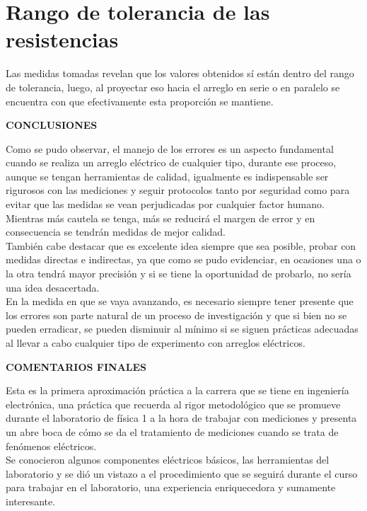 \documentclass[12pt]{article}
\begin{document}
	\section*{Rango de tolerancia de las resistencias}
	
	\noindent Las medidas tomadas revelan que los valores obtenidos sí están dentro del rango de tolerancia, luego, al proyectar eso hacia el arreglo en serie o en paralelo se encuentra con que efectivamente esta proporción se mantiene.\\
	
	\newpage
	
	\begin{center}
		\textbf{\large CONCLUSIONES}\\
	\end{center}
	
	\noindent Como se pudo observar, el manejo de los errores es un aspecto fundamental cuando se realiza un arreglo eléctrico de cualquier tipo, durante ese proceso, aunque se tengan herramientas de calidad, igualmente es indispensable ser rigurosos con las mediciones y seguir protocolos tanto por seguridad como para evitar que las medidas se vean perjudicadas por cualquier factor humano. Mientras más cautela se tenga, más se reducirá el margen de error y en consecuencia se tendrán medidas de mejor calidad.\\
	
	\noindent También cabe destacar que es excelente idea siempre que sea posible, probar con medidas directas e indirectas, ya que como se pudo evidenciar, en ocasiones una o la otra tendrá mayor precisión y si se tiene la oportunidad de probarlo, no sería una idea desacertada.\\
	
	\noindent En la medida en que se vaya avanzando, es necesario siempre tener presente que los errores son parte natural de un proceso de investigación y que si bien no se pueden erradicar, se pueden disminuir al mínimo si se siguen prácticas adecuadas al llevar a cabo cualquier tipo de experimento con arreglos eléctricos.
	
	\newpage
	
	\begin{center}
		\textbf{\large COMENTARIOS FINALES}\\
	\end{center}
	
	\noindent Esta es la primera aproximación práctica a la carrera que se tiene en ingeniería electrónica, una práctica que recuerda al rigor metodológico que se promueve durante el laboratorio de física 1 a la hora de trabajar con mediciones y presenta un abre boca de cómo se da el tratamiento de mediciones cuando se trata de fenómenos eléctricos.\\
	
	\noindent Se conocieron algunos componentes eléctricos básicos, las herramientas del laboratorio y se dió un vistazo a el procedimiento que se seguirá durante el curso para trabajar en el laboratorio, una experiencia enriquecedora y sumamente interesante.
	
\end{document}
